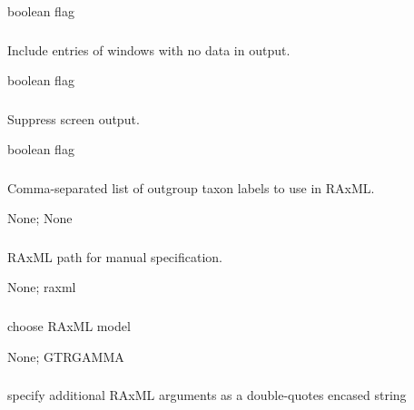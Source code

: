 \documentclass[letterpaper,11pt,english]{sphinxmanual}
\begin{document}
 boolean flag


\subsubsection{}
\label{\detokenize{prog_desc:outputempty}}
 Include entries of windows with no data in output.

 boolean flag


\subsubsection{}
\label{\detokenize{prog_desc:id105}}
 Suppress screen output.

 boolean flag


\subsubsection{}
\label{\detokenize{prog_desc:raxml-outgroups-raxmloutgroups}}
 Comma-separated list of outgroup taxon labels to use in RAxML.

 None;  None


\subsubsection{}
\label{\detokenize{prog_desc:id106}}
 RAxML path for manual specification.

 None;  raxml


\subsubsection{}
\label{\detokenize{prog_desc:raxml-model}}
 choose RAxML model

 None;  GTRGAMMA


\subsubsection{}
\label{\detokenize{prog_desc:raxmlopts}}
 specify additional RAxML arguments as a double-quotes encased string
\end{document}
